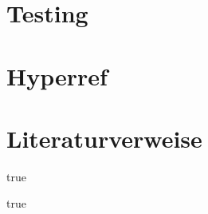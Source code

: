 \documentclass[a4paper,fleqn,german]{book}
\begin{document}
\chapter{Testing}%
%
%
%
%
%
%
%
%
%
%
%
%
%
%
%
%
%
%
%
%
%
%
%
%
%
%
%
%
%
\chapter{Hyperref} \label{refHyperref}%
%
%
\chapter{Literaturverweise}%
%





\anhangstuff %
{true} %
{
%
}




\literaturverzeichnis%
{true} %


\end{document}
